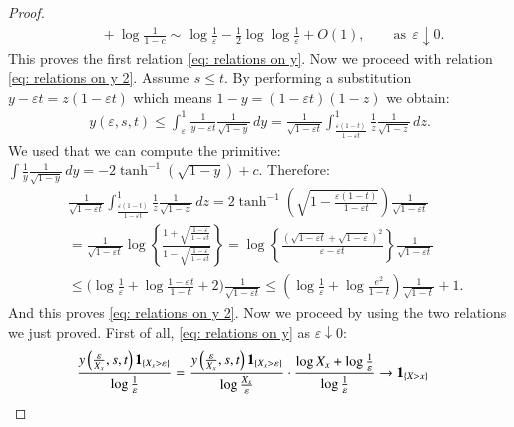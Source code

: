 \begin{proof}
\begin{align*}
    &\quad + \log{\frac{1}{1-c}} \sim \log{\frac{1}{\varepsilon}} - \frac{1}{2} \log{\log{\frac{1}{\varepsilon}}} + O(1), \quad \quad \text{as} \: \: \varepsilon \downarrow 0.
\end{align*}
This proves the first relation \eqref{eq: relations on y}. Now we proceed with relation \eqref{eq: relations on y 2}. Assume $s \leq t$. By performing a substitution $y - \varepsilon t = z (1 - \varepsilon t)$ which means $1 - y = (1 - \varepsilon t)(1 - z)$ we obtain:
\begin{align*}
    y(\varepsilon,s,t) \leq \int_{\varepsilon}^1 \frac{1}{y - \varepsilon t} \frac{1}{\sqrt{1 - y}} \, dy = \frac{1}{\sqrt{1 - \varepsilon t}} \int_{\frac{\varepsilon (1-t)}{1-\varepsilon t}}^{1} \frac{1}{z} \frac{1}{\sqrt{1-z}} \, dz. 
\end{align*}
We used that we can compute the primitive: $\int \frac{1}{y} \frac{1}{\sqrt{1-y}} \, dy = -2 \tanh^{-1}(\sqrt{1-y}) + c$. Therefore:
\begin{align*}
     &\frac{1}{\sqrt{1 - \varepsilon t}}  \int_{\frac{\varepsilon (1-t)}{1-\varepsilon t}}^{1} \frac{1}{z} \frac{1}{\sqrt{1-z}} \, dz = 2 \tanh^{-1}\left( \sqrt{1 - \frac{\varepsilon (1-t)}{1 - \varepsilon t}}\right) \frac{1}{\sqrt{1 - \varepsilon t}}   \\
     & = \frac{1}{\sqrt{1 - \varepsilon t}} \log{\left\{ \frac{1 +  \sqrt{\frac{1 - \varepsilon}{1 - \varepsilon t}} }{ 1 - \sqrt{\frac{1 - \varepsilon}{1 - \varepsilon t}}} \right\}}  = \log{\left\{ \frac{\left(\sqrt{1 - \varepsilon t} + \sqrt{1 - \varepsilon}\right)^2}{\varepsilon - \varepsilon t} \right\}} \frac{1}{\sqrt{1 - \varepsilon t}}  \\
     & \leq \bigg( \log{\frac{1}{\varepsilon}} + \log{\frac{1 - \varepsilon t}{1-t}} + 2\bigg) \frac{1}{\sqrt{1 - \varepsilon t}} \leq \left( \log{\frac{1}{\varepsilon}} + \log{\frac{e^2}{1-t}} \right) \frac{1}{\sqrt{1 - t}} +1.
\end{align*}
And this proves \eqref{eq: relations on y 2}. Now we proceed by using the two relations we just proved. First of all,  \eqref{eq: relations on y} as $\varepsilon \downarrow 0$:
\begin{align*}
    &\frac{y\left( \frac{\varepsilon}{X_x}, s, t \right) \mathbf{1}_{\{X_x > \varepsilon \}}}{\log{\frac{1}{\varepsilon}}} = \frac{y\left( \frac{\varepsilon}{X_x}, s, t \right) \mathbf{1}_{\{X_x > \varepsilon \}}}{\log{\frac{X_x}{\varepsilon}}} \cdot \frac{\log{X_x}  + \log{\frac{1}{\varepsilon}}}{\log{\frac{1}{\varepsilon}}} \rightarrow \mathbf{1}_{\{ X > x\}}
\end{align*}

\end{proof}

